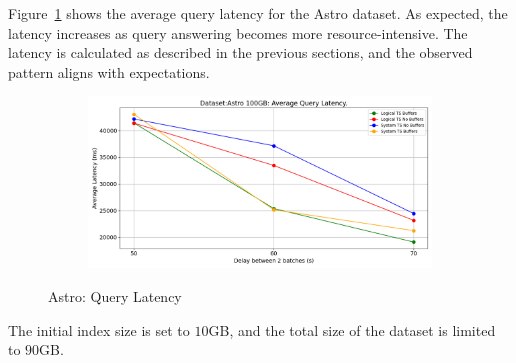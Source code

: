 %
Figure~\ref{fig:query-latency} shows the average query latency for the
Astro dataset. As expected, the latency increases as query answering
becomes more resource-intensive. The latency is calculated as described
in the previous sections, and the observed pattern aligns with expectations.

\begin{figure}
	\centering
	\begin{subfigure}[c]{0.45\textwidth}
		\includegraphics[width=1\textwidth]   {figures/Experiments/Dynamic/ASTRO/average_latency_ASTRO.png}
	\end{subfigure}
	\caption{Astro: Query Latency}
	\label{fig:query-latency}
\end{figure}

The initial index size is set to $10$GB, and the total size of the
dataset is limited to  $90$GB.
 
